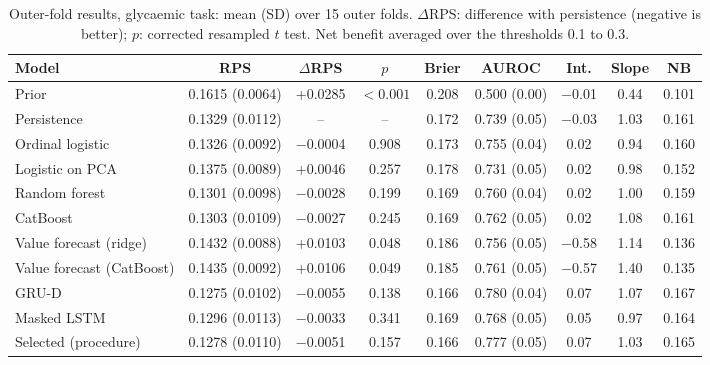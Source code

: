 \begin{table}[htbp]
\centering\footnotesize\setlength{\tabcolsep}{4pt}
\caption{Outer-fold results, glycaemic task: mean (SD) over 15 outer folds. $\Delta$RPS: difference with persistence (negative is better); $p$: corrected resampled $t$ test. Net benefit averaged over the thresholds 0.1 to 0.3.}\label{tab:bench-glycaemic}
\begin{tabular}{@{}lcccccccc@{}}
\toprule
\textbf{Model} & \textbf{RPS} & \textbf{$\Delta$RPS} & \textbf{$p$} & \textbf{Brier} & \textbf{AUROC} & \textbf{Int.} & \textbf{Slope} & \textbf{NB} \\
\midrule
Prior & 0.1615 (0.0064) & +0.0285 & $<0.001$ & 0.208 & 0.500 (0.00) & $-$0.01 & 0.44 & 0.101 \\
Persistence & 0.1329 (0.0112) & -- & -- & 0.172 & 0.739 (0.05) & $-$0.03 & 1.03 & 0.161 \\
\addlinespace
Ordinal logistic & 0.1326 (0.0092) & $-$0.0004 & 0.908 & 0.173 & 0.755 (0.04) & 0.02 & 0.94 & 0.160 \\
Logistic on PCA & 0.1375 (0.0089) & +0.0046 & 0.257 & 0.178 & 0.731 (0.05) & 0.02 & 0.98 & 0.152 \\
Random forest & 0.1301 (0.0098) & $-$0.0028 & 0.199 & 0.169 & 0.760 (0.04) & 0.02 & 1.00 & 0.159 \\
CatBoost & 0.1303 (0.0109) & $-$0.0027 & 0.245 & 0.169 & 0.762 (0.05) & 0.02 & 1.08 & 0.161 \\
Value forecast (ridge) & 0.1432 (0.0088) & +0.0103 & 0.048 & 0.186 & 0.756 (0.05) & $-$0.58 & 1.14 & 0.136 \\
Value forecast (CatBoost) & 0.1435 (0.0092) & +0.0106 & 0.049 & 0.185 & 0.761 (0.05) & $-$0.57 & 1.40 & 0.135 \\
GRU-D & 0.1275 (0.0102) & $-$0.0055 & 0.138 & 0.166 & 0.780 (0.04) & 0.07 & 1.07 & 0.167 \\
Masked LSTM & 0.1296 (0.0113) & $-$0.0033 & 0.341 & 0.169 & 0.768 (0.05) & 0.05 & 0.97 & 0.164 \\
Selected (procedure) & 0.1278 (0.0110) & $-$0.0051 & 0.157 & 0.166 & 0.777 (0.05) & 0.07 & 1.03 & 0.165 \\
\bottomrule
\end{tabular}
\end{table}
